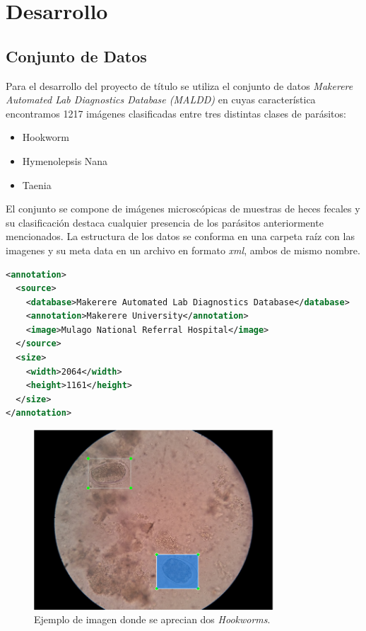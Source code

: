 \documentclass[letter,12pt]{report}
\begin{document}
\section{Desarrollo}
\subsection{Conjunto de Datos}
Para el desarrollo del proyecto de título se utiliza el conjunto de datos \textit{Makerere
Automated Lab Diagnostics Database (MALDD)} en cuyas característica encontramos 1217 imágenes 
clasificadas entre tres distintas clases de parásitos:

\begin{itemize}
    \item Hookworm
    \item Hymenolepsis Nana
    \item Taenia
\end{itemize}

El conjunto se compone de imágenes microscópicas de muestras de heces fecales y su
clasificación destaca cualquier presencia de los parásitos anteriormente mencionados. 
La estructura de los datos se conforma en una carpeta raíz con las imagenes y su meta data
en un archivo en formato \textit{xml}, ambos de mismo nombre.

\begin{lstlisting}[language=xml]
<annotation>
  <source>
    <database>Makerere Automated Lab Diagnostics Database</database>
    <annotation>Makerere University</annotation>
    <image>Mulago National Referral Hospital</image>
  </source>
  <size>
    <width>2064</width>
    <height>1161</height>
  </size>
</annotation>
\end{lstlisting}

\begin{figure}[ht]
    \centering
    \includegraphics[width=0.8\textwidth]{labelImage}
    \caption{Ejemplo de imagen donde se aprecian dos \textit{Hookworms}.}
    \label{fig:labelImage}
\end{figure}
\end{document}
